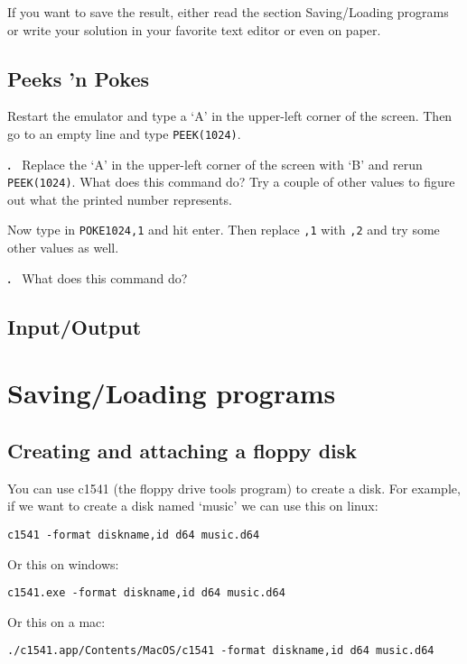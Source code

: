 \documentclass{article}
\newcounter{problem}
\newcounter{solution}
\newcommand\problem{%
  \stepcounter{problem}%
  \textbf{\theproblem.}~%
  \setcounter{solution}{0}%
}
\begin{document}
If you want to save the result, either read the section Saving/Loading programs or write your solution in your favorite text editor or even on paper.

\subsection{Peeks 'n Pokes}

Restart the emulator and type a `A' in the upper-left corner of the screen.
Then go to an empty line and type \verb:PEEK(1024):.

\problem Replace the `A' in the upper-left corner of the screen with `B' and rerun \verb:PEEK(1024):.
What does this command do? Try a couple of other values to figure out what the printed number represents.

Now type in \verb:POKE1024,1: and hit enter. Then replace \verb:,1: with \verb:,2: and try some other values as well.

\problem What does this command do?

\subsection{Input/Output}

\section{Saving/Loading programs}

\subsection{Creating and attaching a floppy disk}

You can use c1541 (the floppy drive tools program) to create a disk.
For example, if we want to create a disk named `music' we can use this on linux:

\begin{lstlisting}
c1541 -format diskname,id d64 music.d64
\end{lstlisting}

Or this on windows:

\begin{lstlisting}
c1541.exe -format diskname,id d64 music.d64
\end{lstlisting}

Or this on a mac:

\begin{lstlisting}
./c1541.app/Contents/MacOS/c1541 -format diskname,id d64 music.d64
\end{lstlisting}
\end{document}
